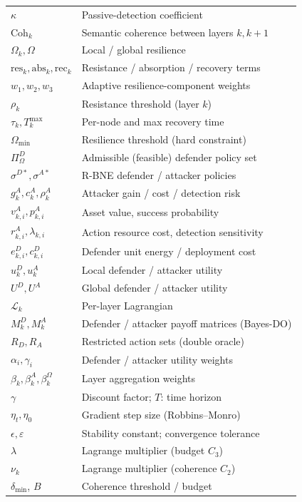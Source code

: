 \documentclass[conference]{IEEEtran}
\newcommand{\Coh}{\mathrm{Coh}}
\begin{document}
\begin{table}[t]
\begin{tabular}{ll}
$\kappa$ & Passive-detection coefficient \\
$\Coh_k$ & Semantic coherence between layers $k,k{+}1$ \\
$\Omega_k,\Omega$ & Local / global resilience \\
$\mathrm{res}_k,\mathrm{abs}_k,\mathrm{rec}_k$ & Resistance / absorption / recovery terms \\
$w_1,w_2,w_3$ & Adaptive resilience-component weights \\
$\rho_k$ & Resistance threshold (layer $k$) \\
$\tau_k,T_k^{\max}$ & Per-node and max recovery time \\
$\Omega_{\min}$ & Resilience threshold (hard constraint) \\
$\Pi^D_\Omega$ & Admissible (feasible) defender policy set \\
$\sigma^{D*},\sigma^{A*}$ & R-BNE defender / attacker policies \\
$g_k^A,c_k^A,\rho_k^A$ & Attacker gain / cost / detection risk \\
$v_{k,i}^A,p_{k,i}^A$ & Asset value, success probability \\
$r_{k,i}^A,\lambda_{k,i}$ & Action resource cost, detection sensitivity \\
$e_{k,i}^D,c_{k,i}^D$ & Defender unit energy / deployment cost \\
$u_k^D,u_k^A$ & Local defender / attacker utility \\
$U^D,U^A$ & Global defender / attacker utility \\
$\mathcal{L}_k$ & Per-layer Lagrangian \\
$M_k^D,M_k^A$ & Defender / attacker payoff matrices (Bayes-DO) \\
$R_D,R_A$ & Restricted action sets (double oracle) \\
$\alpha_i,\gamma_i$ & Defender / attacker utility weights \\
$\beta_k,\beta_k^A,\beta_k^\Omega$ & Layer aggregation weights \\
$\gamma$ & Discount factor; \;$T$: time horizon \\
$\eta_t,\eta_0$ & Gradient step size (Robbins--Monro) \\
$\epsilon,\varepsilon$ & Stability constant; convergence tolerance \\
$\lambda$ & Lagrange multiplier (budget $C_3$) \\
$\nu_k$ & Lagrange multiplier (coherence $C_2$) \\
$\delta_{\min}$, $B$ & Coherence threshold / budget \\
\bottomrule
\end{tabular}
\end{table}
\end{document}
